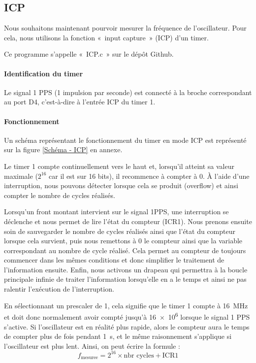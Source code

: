 \documentclass[12pt, a4paper, titlepage]{article}
\begin{document}
\subsection{ICP}

Nous souhaitons maintenant pourvoir mesurer la fréquence de l'oscillateur. Pour cela, nous utilisons la fonction «~input capture~» (ICP) d'un timer.

Ce programme s'appelle «~ICP.c~» sur le dépôt Github.

\paragraph{Identification du timer}

Le signal 1 PPS (1 impulsion par seconde) est connecté à la broche correspondant au port D4, c'est-à-dire à l'entrée ICP du timer 1.

\paragraph{Fonctionnement}

Un schéma représentant le fonctionnement du timer en mode ICP est représenté sur la figure \ref{Schéma - ICP} en annexe.

Le timer 1 compte continuellement vers le haut et, lorsqu'il atteint sa valeur maximale ($2^{16}$ car il est sur 16 bits), il recommence à compter à 0. À l'aide d'une interruption, nous pouvons détecter lorsque cela se produit (overflow) et ainsi compter le nombre de cycles réalisés.

Lorsqu'un front montant intervient sur le signal 1PPS, une interruption se déclenche et nous permet de lire l'état du compteur (ICR1). Nous prenons ensuite soin de sauvegarder le nombre de cycles réalisés ainsi que l'état du compteur lorsque cela survient, puis nous remettons à 0 le compteur ainsi que la variable correspondant au nombre de cycle réalisé. Cela permet au compteur de toujours commencer dans les mêmes conditions et donc simplifier le traitement de l'information ensuite. Enfin, nous activons un drapeau qui permettra à la boucle principale infinie de traiter l'information lorsqu'elle en a le temps et ainsi ne pas ralentir l'exécution de l'interruption.

En sélectionnant un prescaler de 1, cela signifie que le timer 1 compte à \SI{16}{\mega\hertz} et doit donc normalement avoir compté jusqu'à \num{16e6} lorsque le signal 1 PPS s'active. Si l'oscillateur est en réalité plus rapide, alors le compteur aura le temps de compter plus de fois pendant \SI{1}{\second}, et le même raisonnement s'applique si l'oscillateur est plus lent. Ainsi, on peut écrire la formule : \nopagebreak
\[
f_{\text{mesuree}} = 2^{16} \times \text{nbr cycles} + \text{ICR1}
\]
\end{document}

